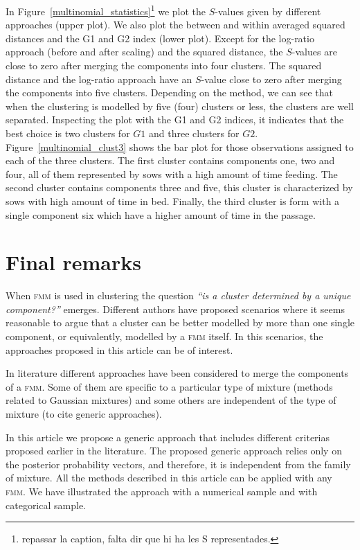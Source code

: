 \documentclass[submit]{smj}
\theoremstyle{definition}
\newcommand{\fmm}{\textsc{fmm}\xspace}
\begin{document}
In Figure~\ref{multinomial_statistics}\footnote{repassar la caption, falta dir que hi ha les S representades.} we plot the $S$-values given by different approaches (upper plot). We also plot the between and within averaged squared distances and the G1 and G2 index (lower plot). Except for the log-ratio approach (before and after scaling) and the squared distance, the $S$-values are close to zero after merging the components into four clusters. The squared distance and the log-ratio approach have an $S$-value close to zero after merging the components into five clusters. Depending on the method, we can see that when the clustering is modelled by five (four) clusters or less, the clusters are well separated. Inspecting the plot with the G1 and G2 indices, it indicates that the best choice is two clusters for $G1$ and three clusters for $G2$. Figure~\ref{multinomial_clust3} shows the bar plot for those observations assigned to each of the three clusters. The first cluster contains components one, two and four, all of them represented by sows with a high amount of time feeding. The second cluster contains components three and five, this cluster is characterized by sows with high amount of time in bed. Finally, the third cluster is form with a single component six which have a higher amount of time in the passage.



\section{Final remarks}\label{remarks}

When \fmm is used in clustering the question \textit{``is a cluster determined by a unique component?''} emerges. Different authors have proposed scenarios where it seems reasonable to argue that a cluster can be better modelled by more than one single component, or equivalently, modelled by a \fmm itself. In this scenarios, the approaches proposed in this article can be of interest.

In literature different approaches have been considered to merge the components of a \fmm. Some of them are specific to a particular type of mixture (methods related to Gaussian mixtures) and some others are independent of the type of mixture (to cite generic approaches). 

In this article we propose a generic approach that includes different criterias proposed earlier in the literature. The proposed generic approach relies only on the posterior probability vectors, and therefore, it is independent from the family of mixture. All the methods described in this article can be applied with any \fmm. We have illustrated the approach with a numerical sample and with categorical sample. 
\end{document}
